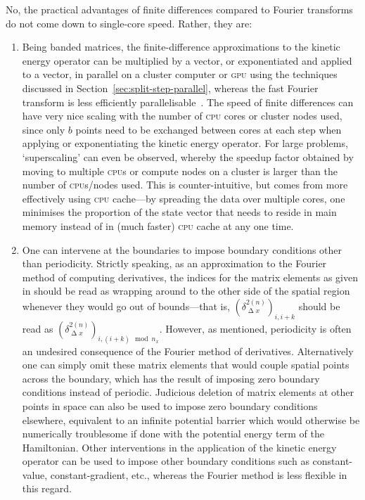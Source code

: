 No, the practical advantages of finite differences compared to Fourier transforms do not come down to single-core speed. Rather, they are:
\begin{enumerate}
    \item Being banded matrices, the finite-difference approximations to the kinetic energy operator can be multiplied by a vector, or exponentiated and applied to a vector, in parallel on a cluster computer or \textsc{gpu} using the techniques discussed in Section~\ref{sec:split-step-parallel}, whereas the fast Fourier transform is less efficiently parallelisable~\cite{Gupta93thescalability}. The speed of finite differences can have very nice scaling with the number of \textsc{cpu} cores or cluster nodes used, since only $b$ points need to be exchanged between cores at each step when applying or exponentiating the kinetic energy operator. For large problems, `superscaling' can even be observed, whereby the speedup factor obtained by moving to multiple \textsc{cpu}s or compute nodes on a cluster is larger than the number of \textsc{cpu}s/nodes used. This is counter-intuitive, but comes from more effectively using \textsc{cpu} cache---by spreading the data over multiple cores, one minimises the proportion of the state vector that needs to reside in main memory instead of in (much faster) \textsc{cpu} cache at any one time.
    \item One can intervene at the boundaries to impose boundary conditions other than periodicity. Strictly speaking, as an approximation to the Fourier method of computing derivatives, the indices for the matrix elements as given in  should be read as wrapping around to the other side of the spatial region whenever they would go out of bounds---that is, $(\delta^{2 (n)}_{\upDelta x})_{i, i + k}$ should be read as $(\delta^{2 (n)}_{\upDelta x})_{i, (i + k) \mod n_x}$. However, as mentioned, periodicity is often an undesired consequence of the Fourier method of derivatives. Alternatively one can simply omit these matrix elements that would couple spatial points across the boundary, which has the result of imposing zero boundary conditions instead of periodic. Judicious deletion of matrix elements at other points in space can also be used to impose zero boundary conditions elsewhere, equivalent to an infinite potential barrier which would otherwise be numerically troublesome if done with the potential energy term of the Hamiltonian. Other interventions in the application of the kinetic energy operator can be used to impose other boundary conditions such as constant-value, constant-gradient, etc., whereas the Fourier method is less flexible in this regard.

\end{enumerate}
